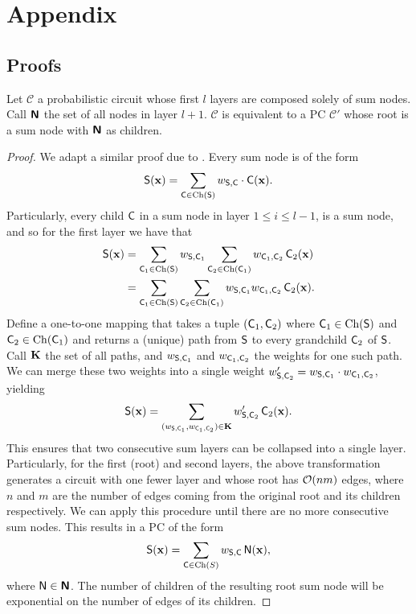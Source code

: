 
\chapter{Appendix}

\section{Proofs}

\begin{theorem}
  \label{thm:summix}
  Let $\mathcal{C}$ a probabilistic circuit whose first $l$ layers are composed solely of sum
  nodes. Call $\Nodes$ the set of all nodes in layer $l+1$. $\mathcal{C}$ is equivalent to a PC
  $\mathcal{C}'$ whose root is a sum node with $\Nodes$ as children.
\end{theorem}
\begin{proof}
  We adapt a similar proof due to \citet{jaini18b}. Every sum node is of the form
  \begin{equation*}
    \Sum(\set{x})=\sum_{\Child\in\Ch(\Sum)}w_{\Sum,\Child}\cdot\Child(\set{x}).
  \end{equation*}
  Particularly, every child $\Child$ in a sum node in layer $1\leq i\leq l-1$, is a sum node, and
  so for the first layer we have that
  \begin{align*}
    \Sum(\set{x})&=\sum_{\Child_1\in\Ch(\Sum)}w_{\Sum,\Child_1}\sum_{\Child_2\in\Ch(\Child_1)}
    w_{\Child_1,\Child_2}\Child_2(\set{x})\\
                 &=\sum_{\Child_1\in\Ch(\Sum)}\sum_{\Child_2\in\Ch(\Child_1)}w_{\Sum,\Child_1}
    w_{\Child_1,\Child_2}\Child_2(\set{x}).
  \end{align*}
  Define a one-to-one mapping that takes a tuple $(\Child_1,\Child_2)$ where $\Child_1\in\Ch(\Sum)$
  and $\Child_2\in\Ch(\Child_1)$ and returns a (unique) path from $\Sum$ to every grandchild
  $\Child_2$ of $\Sum$. Call $\set{K}$ the set of all paths, and $w_{\Sum,\Child_1}$ and
    $w_{\Child_1,\Child_2}$ the weights for one such path. We can merge these two weights into a
  single weight $w_{\Sum,\Child_2}'= w_{\Sum,\Child_1}\cdot w_{\Child_1,\Child_2}$, yielding
  \begin{equation*}
    \Sum(\set{x})=\sum_{(w_{\Sum,\Child_1},w_{\Child_1,\Child_2})\in\set{K}} w_{\Sum,\Child_2}'
    \Child_2(\set{x}).
  \end{equation*}
  This ensures that two consecutive sum layers can be collapsed into a single layer. Particularly,
  for the first (root) and second layers, the above transformation generates a circuit with one
  fewer layer and whose root has $\bigo(nm)$ edges, where $n$ and $m$ are the number of edges coming
  from the original root and its children respectively. We can apply this procedure until there are
  no more consecutive sum nodes. This results in a PC of the form
  \begin{equation*}
    \Sum(\set{x})=\sum_{\Child\in\Ch(S)} w_{\Sum,\Child}\Node(\set{x}),
  \end{equation*}
  where $\Node\in\Nodes$. The number of children of the resulting root sum node will be exponential
  on the number of edges of its children.
\end{proof}

